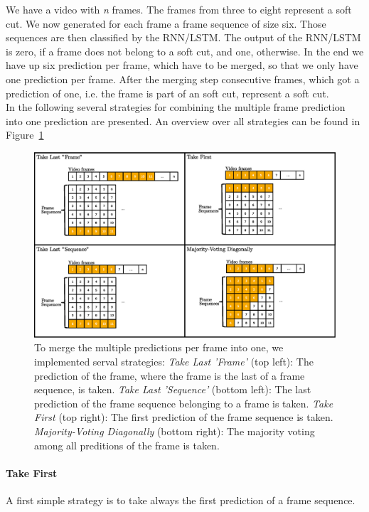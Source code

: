 We have a video with \textit{n} frames.
The frames from three to eight represent a soft cut.
We now generated for each frame a frame sequence of size six.
Those sequences are then classified by the RNN/LSTM.
The output of the RNN/LSTM is zero, if a frame does not belong to a soft cut, and one, otherwise.
In the end we have up six prediction per frame, which have to be merged, so that we only have one prediction per frame.
After the merging step consecutive frames, which got a prediction of one, i.e. the frame is part of an soft cut, represent a soft cut. \\
In the following several strategies for combining the multiple frame prediction into one prediction are presented.
An overview over all strategies can be found in Figure~\ref{fig:merging_strategies}
\begin{figure}[!htb]
	\centering
	\includegraphics[scale=.5]{images/merging_strategies.eps}
	\caption{To merge the multiple predictions per frame into one, we implemented serval strategies: \textit{Take Last 'Frame'} (top left): The prediction of the frame, where the frame is the last of a frame sequence, is taken. \textit{Take Last 'Sequence'} (bottom left): The last prediction of the frame sequence belonging to a frame is taken. \textit{Take First} (top right): The first prediction of the frame sequence is taken. \textit{Majority-Voting Diagonally} (bottom right): The majority voting among all preditions of the frame is taken.}
	\label{fig:merging_strategies}
\end{figure}

\paragraph{Take First}
A first simple strategy is to take always the first prediction of a frame sequence.

